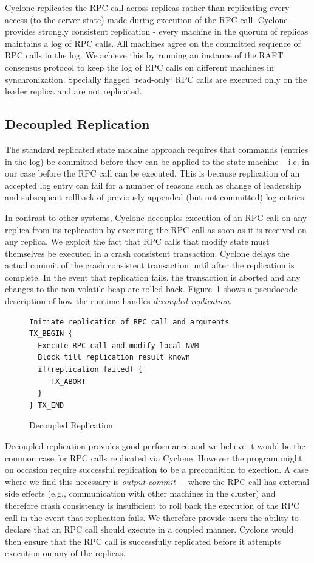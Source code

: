 \documentclass[letterpaper,twocolumn,10pt]{article}
\begin{document}
Cyclone replicates the RPC call across replicas rather than replicating
every access (to the server state) made during execution of the RPC call.
Cyclone provides strongly consistent replication - every machine in the quorum
of replicas maintains a log of RPC calls.  All machines agree on the committed
sequence of RPC calls in the log. We achieve this by running an instance of the
RAFT~\cite{raft} consensus protocol to keep the log of RPC calls on different
machines in synchronization. Specially flagged `read-only` RPC calls are
executed only on the leader replica and are not replicated.

\subsection{Decoupled Replication}
\label{sec:decouple}
The standard replicated state machine approach requires that commands (entries
in the log) be committed before they can be applied to the state machine --
i.e. in our case before the RPC call can be executed. This is because
replication of an accepted log entry can fail for a
number of reasons such as change of leadership and subsequent
rollback of previously appended (but not committed) log entries.

In contrast to other systems, Cyclone decouples execution of an RPC call on any
replica from its replication by executing the RPC call as soon as it is received
on any replica. We exploit the fact that RPC calls that modify state must
themselves be executed in a crash consistent transaction. Cyclone delays the
actual commit of the crash consistent transaction until after the replication is
complete. In the event that replication fails, the transaction is aborted and
any changes to the non volatile heap are rolled back. Figure~\ref{fig:async_rep}
shows a pseudocode description of how the runtime handles \emph{decoupled
  replication}.

\begin{figure}
{ \scriptsize
\begin{verbatim}
Initiate replication of RPC call and arguments 
TX_BEGIN { 
  Execute RPC call and modify local NVM 
  Block till replication result known 
  if(replication failed) {
     TX_ABORT 
  } 
} TX_END
\end{verbatim}
}
\caption{Decoupled Replication}
\label{fig:async_rep}
\end{figure}

Decoupled replication provides good performance and we believe it would be the
common case for RPC calls replicated via Cyclone. However the program might on
occasion require successful replication to be a precondition to exection. A case
where we find this necessary is \textit{output commit}~\cite{output_commit} -
where the RPC call has external side effects (e.g., communication with other
machines in the cluster) and therefore crash consistency is insufficient to roll
back the execution of the RPC call in the event that replication fails. We
therefore provide users the ability to declare that an RPC call should execute
in a coupled manner. Cyclone would then ensure that the RPC call is successfully
replicated before it attempts execution on any of the replicas.
\end{document}
